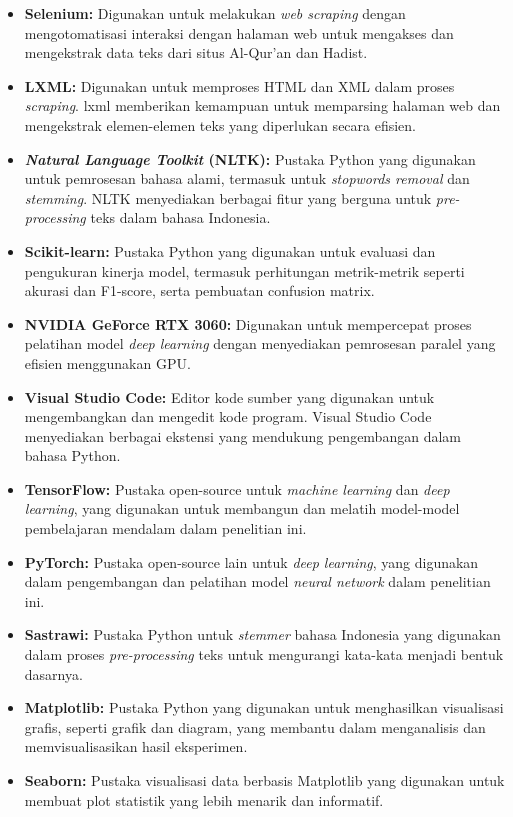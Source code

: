 \documentclass[12pt,a4paper]{article}
\begin{document}
\begin{itemize}
    \item \textbf{Selenium:} Digunakan untuk melakukan \textit{web scraping} dengan mengotomatisasi interaksi dengan halaman web untuk mengakses dan mengekstrak data teks dari situs Al-Qur'an dan Hadist.
    
    \item \textbf{LXML:} Digunakan untuk memproses HTML dan XML dalam proses \textit{scraping}. lxml memberikan kemampuan untuk memparsing halaman web dan mengekstrak elemen-elemen teks yang diperlukan secara efisien.
    
    \item \textbf{\textit{Natural Language Toolkit} (NLTK):} Pustaka Python yang digunakan untuk pemrosesan bahasa alami, termasuk untuk \textit{stopwords removal} dan \textit{stemming}. NLTK menyediakan berbagai fitur yang berguna untuk \textit{pre-processing} teks dalam bahasa Indonesia.
    
    \item \textbf{Scikit-learn:} Pustaka Python yang digunakan untuk evaluasi dan pengukuran kinerja model, termasuk perhitungan metrik-metrik seperti akurasi dan F1-score, serta pembuatan confusion matrix.

    \item \textbf{NVIDIA GeForce RTX 3060:} Digunakan untuk mempercepat proses pelatihan model \textit{deep learning} dengan menyediakan pemrosesan paralel yang efisien menggunakan GPU.
    
    \item \textbf{Visual Studio Code:} Editor kode sumber yang digunakan untuk mengembangkan dan mengedit kode program. Visual Studio Code menyediakan berbagai ekstensi yang mendukung pengembangan dalam bahasa Python.
    
    \item \textbf{TensorFlow:} Pustaka open-source untuk \textit{machine learning} dan \textit{deep learning}, yang digunakan untuk membangun dan melatih model-model pembelajaran mendalam dalam penelitian ini.
    
    \item \textbf{PyTorch:} Pustaka open-source lain untuk \textit{deep learning}, yang digunakan dalam pengembangan dan pelatihan model \textit{neural network} dalam penelitian ini.

    \item \textbf{Sastrawi:} Pustaka Python untuk \textit{stemmer} bahasa Indonesia yang digunakan dalam proses \textit{pre-processing} teks untuk mengurangi kata-kata menjadi bentuk dasarnya.

    \item \textbf{Matplotlib:} Pustaka Python yang digunakan untuk menghasilkan visualisasi grafis, seperti grafik dan diagram, yang membantu dalam menganalisis dan memvisualisasikan hasil eksperimen.
    
    \item \textbf{Seaborn:} Pustaka visualisasi data berbasis Matplotlib yang digunakan untuk membuat plot statistik yang lebih menarik dan informatif.
\end{itemize}
\end{document}
